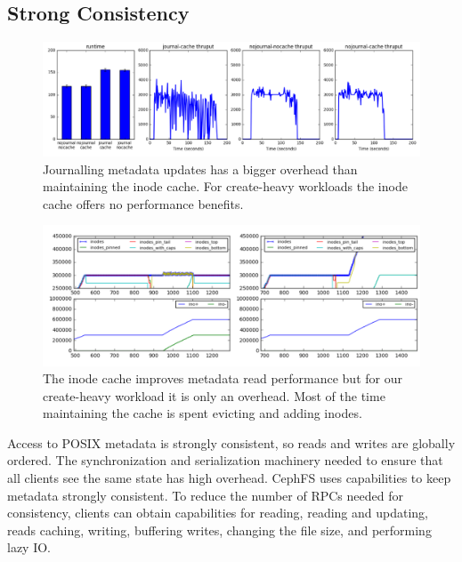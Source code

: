 \subsection{Strong Consistency} 

\begin{figure}[tb]%
\centering
\includegraphics[width=180mm]{figures/throughput-cache-journal.png}
\caption{Journalling metadata updates has a bigger overhead than maintaining
the inode cache. For create-heavy workloads the inode cache offers no
performance benefits. }\label{fig:throughput-cache-journal}
\end{figure}

\begin{figure}[tb]%
\centering
\includegraphics[width=180mm]{figures/inode-cache.png}
\caption{The inode cache improves metadata read performance but for our
create-heavy workload it is only an overhead. Most of the time maintaining the
cache is spent evicting and adding inodes.}\label{fig:inode-cache}
\end{figure}

Access to POSIX metadata is strongly consistent, so reads and writes are
globally ordered. The synchronization and serialization machinery needed to
ensure that all clients see the same state has high overhead.  CephFS uses
capabilities to keep metadata strongly consistent. To reduce the number of RPCs
needed for consistency, clients can obtain capabilities for reading, reading
and updating, reads caching, writing, buffering writes, changing the file size,
and performing lazy IO.

